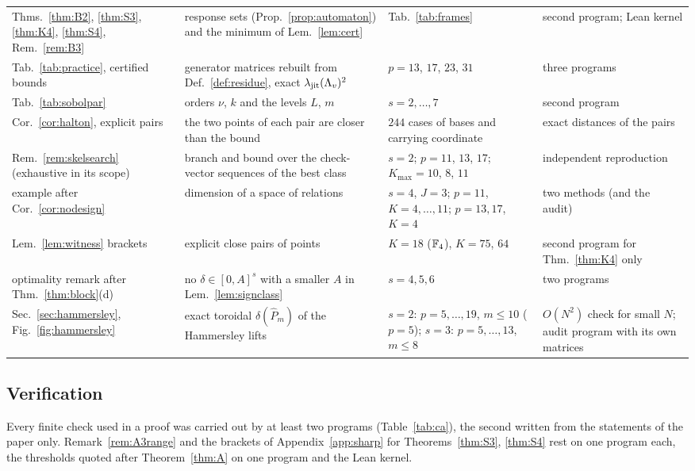 \begin{table}[tp]
\begin{tabular}{@{}>{\raggedright\arraybackslash}p{}>{\raggedright\arraybackslash}p{}>{\raggedright\arraybackslash}p{}>{\raggedright\arraybackslash}p{}@{}}
Thms.~\ref{thm:B2}, \ref{thm:S3}, \ref{thm:K4}, \ref{thm:S4}, Rem.~\ref{rem:B3} & response sets (Prop.~\ref{prop:automaton}) and the minimum of Lem.~\ref{lem:cert} & Tab.~\ref{tab:frames} & second program; Lean kernel\\
Tab.~\ref{tab:practice}, certified bounds & generator matrices rebuilt from Def.~\ref{def:residue}, exact $\lambda_{\mathrm{jit}}(\Lambda_v)^2$ & $p=13$, $17$, $23$, $31$ & three programs\\
\midrule
Tab.~\ref{tab:sobolpar} & orders $\nu$, $k$ and the levels $L$, $m$ & $s=2,\dots,7$ & second program\\
Cor.~\ref{cor:halton}, explicit pairs & the two points of each pair are closer than the bound & $244$ cases of bases and carrying coordinate & exact distances of the pairs\\
Rem.~\ref{rem:skelsearch} (exhaustive in its scope) & branch and bound over the check-vector sequences of the best class & $s=2$; $p=11$, $13$, $17$; $K_{\max}=10$, $8$, $11$ & independent reproduction\\
example after Cor.~\ref{cor:nodesign} & dimension of a space of relations & $s=4$, $J=3$; $p=11$, $K=4,\dots,11$; $p=13,17$, $K=4$ & two methods (and the audit)\\
Lem.~\ref{lem:witness} brackets & explicit close pairs of points & $K=18$ ($\mathbb{F}_4$), $K=75$, $64$ & second program for Thm.~\ref{thm:K4} only\\
optimality remark after Thm.~\ref{thm:block}(d) & no $\delta\in[0,A]^s$ with a smaller $A$ in Lem.~\ref{lem:signclass} & $s=4,5,6$ & two programs\\
Sec.~\ref{sec:hammersley}, Fig.~\ref{fig:hammersley} & exact toroidal $\delta(\hat P_m)$ of the Hammersley lifts & $s=2$: $p=5,\dots,19$, $m\le10$ ($p=5$); $s=3$: $p=5,\dots,13$, $m\le8$ & $O(N^2)$ check for small $N$; audit program with its own matrices\\
\bottomrule
\end{tabular}
\end{table}

\subsection{Verification}\label{app:verification}
Every finite check used in a proof was carried out by at least two programs (Table~\ref{tab:ca}), the second written from the statements of the paper only. Remark~\ref{rem:A3range} and the brackets of Appendix~\ref{app:sharp} for Theorems~\ref{thm:S3}, \ref{thm:S4} rest on one program each, the thresholds quoted after Theorem~\ref{thm:A} on one program and the Lean kernel.

